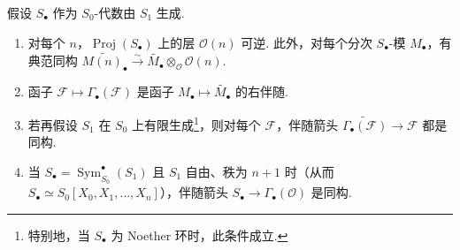 \begin{proposition}\label{item:ag-2-1-2}
假设 $S_\bullet$ 作为 $S_0$-代数由 $S_1$ 生成.
\begin{enumerate}[label=\roman*)]
\item 对每个 $n$，$\operatorname{Proj}(S_\bullet)$ 上的层 $\mathcal O(n)$ 可逆. 此外，对每个分次 $S_\bullet$-模 $M_\bullet$，有典范同构 $\widetilde{M(n)_\bullet}\xrightarrow\sim\widetilde{M_\bullet}\otimes_{\mathcal O}\mathcal O(n)$.
\item 函子 $\mathcal F\mapsto\Gamma_\bullet(\mathcal F)$ 是函子 $M_\bullet\mapsto\widetilde{M_\bullet}$ 的右伴随.
\item 若再假设 $S_1$ 在 $S_0$ 上有限生成\footnote{特别地，当 $S_\bullet$ 为 Noether 环时，此条件成立.}，则对每个 $\mathcal F$，伴随箭头 $\widetilde{\Gamma_\bullet(\mathcal F)}\longrightarrow\mathcal F$ 都是同构.
\item 当 $S_\bullet=\operatorname{Sym}_{S_0}^\bullet(S_1)$ 且 $S_1$ 自由、秩为 $n+1$ 时（从而 $S_\bullet\simeq S_0[X_0,X_1,\ldots,X_n]$），伴随箭头 $S_\bullet\longrightarrow\Gamma_\bullet(\mathcal O)$ 是同构.
\end{enumerate}
\end{proposition}
